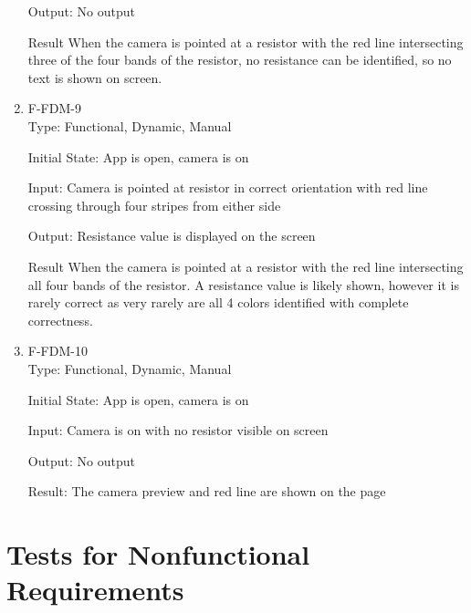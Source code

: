\documentclass[12pt, titlepage]{article}
\begin{document}
\begin{enumerate}
Output: 
No output	

Result
When the camera is pointed at a resistor with the red line intersecting three of the four bands of the resistor,
no resistance can be identified, so no text is shown on screen.

\item{F-FDM-9\\}
Type: Functional, Dynamic, Manual
					
Initial State: 
App is open, camera is on
					
Input: 
Camera is pointed at resistor in correct orientation with red line crossing through four stripes from either side
					
Output: 
Resistance value is displayed on the screen	

Result
When the camera is pointed at a resistor with the red line intersecting all four bands of the resistor.
A resistance value is likely shown, however it is rarely correct as very rarely are all 4 colors identified with complete correctness.

\item{F-FDM-10\\}
Type: Functional, Dynamic, Manual
					
Initial State: 
App is open, camera is on
					
Input: 
Camera is on with no resistor visible on screen
					
Output: 
No output

Result:
The camera preview and red line are shown on the page

\end{enumerate}

\section{Tests for Nonfunctional Requirements}
\end{document}
